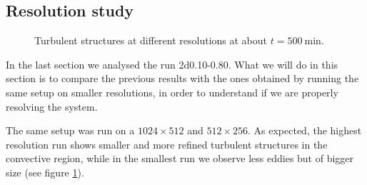 \subsection{Resolution study}
\begin{figure}[t!]
  \centering
  \centering
      \hfill
    \caption{Turbulent structures at different resolutions at about $t=500 \ \mathrm{min}$.}
    \label{fig:differentialmach}
 \end{figure}

In the last section we analysed the run 2d0.10-0.80. What we will do in this section is to compare the previous results with the ones obtained by running the same setup on smaller resolutions, in order to understand if we are properly resolving the system. 

The same setup was run on a $1024 \times 512$ and $512 \times 256$. As expected, the highest resolution run shows smaller and more refined turbulent structures in the convective region, while in the smallest run we observe less eddies but of bigger size (see figure \ref{fig:differentialmach}).

